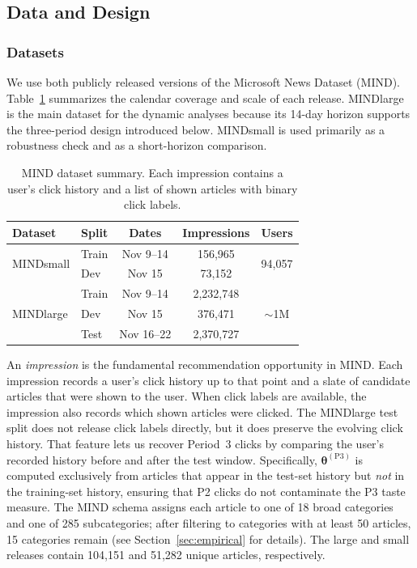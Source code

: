 \documentclass[11pt]{article}
\begin{document}
\subsection{Data and Design}
\label{sec:data}

\subsubsection{Datasets}

We use both publicly released versions of the Microsoft News Dataset (MIND). Table~\ref{tab:datasets} summarizes the calendar coverage and scale of each release. MINDlarge is the main dataset for the dynamic analyses because its 14-day horizon supports the three-period design introduced below. MINDsmall is used primarily as a robustness check and as a short-horizon comparison.

\begin{table}[ht]
\centering
\caption{MIND dataset summary. Each impression contains a user's click history and a list of shown articles with binary click labels.}
\label{tab:datasets}
\begin{tabular}{llccc}
\toprule
Dataset & Split & Dates & Impressions & Users \\
\midrule
\multirow{2}{*}{MINDsmall} & Train & Nov 9--14 & 156,965 & \multirow{2}{*}{94,057} \\
 & Dev & Nov 15 & 73,152 & \\
\midrule
\multirow{3}{*}{MINDlarge} & Train & Nov 9--14 & 2,232,748 & \multirow{3}{*}{${\sim}$1M} \\
 & Dev & Nov 15 & 376,471 & \\
 & Test & Nov 16--22 & 2,370,727 & \\
\bottomrule
\end{tabular}
\end{table}
\FloatBarrier

An \emph{impression} is the fundamental recommendation opportunity in MIND. Each impression records a user's click history up to that point and a slate of candidate articles that were shown to the user. When click labels are available, the impression also records which shown articles were clicked. The MINDlarge test split does not release click labels directly, but it does preserve the evolving click history. That feature lets us recover Period~3 clicks by comparing the user's recorded history before and after the test window. Specifically, $\boldsymbol{\theta}^{(\text{P3})}$ is computed exclusively from articles that appear in the test-set history but \emph{not} in the training-set history, ensuring that P2 clicks do not contaminate the P3 taste measure. The MIND schema assigns each article to one of 18 broad categories and one of 285 subcategories; after filtering to categories with at least 50 articles, 15 categories remain (see Section~\ref{sec:empirical} for details). The large and small releases contain 104,151 and 51,282 unique articles, respectively.
\end{document}
